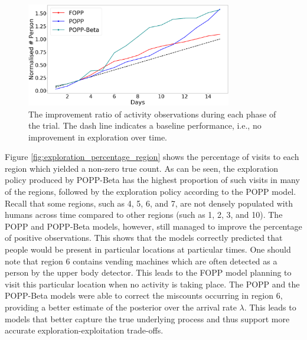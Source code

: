 \begin{figure}[t!]
	\centering
	\includegraphics[width=0.8\textwidth]{./figures/exploration_number_people_across_days_normalised.png}
	\caption{The improvement ratio of activity observations during each phase of the trial. The dash line indicates a baseline performance, i.e., no improvement in exploration over time.}
	\label{fig:exploration_improvement_ratio}
	\vspace{-25pt}
\end{figure}

Figure \ref{fig:exploration_percentage_region} shows the percentage of visits to each region which yielded a non-zero true count. As can be seen, the exploration policy produced by POPP-Beta has the highest proportion of such visits in many of the regions, followed by the exploration policy according to the POPP model. Recall that some regions, such as 4, 5, 6, and 7, are not densely populated with humans across time compared to other regions (such as 1, 2, 3, and 10). The POPP and POPP-Beta models, however, still managed to improve the percentage of positive observations. This shows that the models correctly predicted that people would be present in particular locations at particular times. One should note that region 6 contains vending machines which are often detected as a person by the upper body detector. This leads to the FOPP model planning to visit this particular location when no activity is taking place. The POPP and the POPP-Beta models were able to correct the miscounts occurring in region 6, providing a better estimate of the posterior over the arrival rate $\lambda$. This leads to models that better capture the true underlying process and thus support more accurate exploration-exploitation trade-offs.


